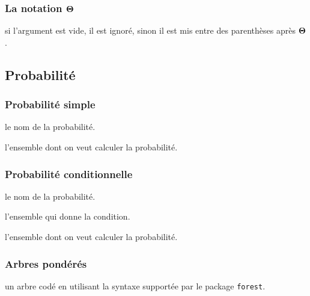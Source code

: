 \documentclass[12pt,a4paper]{article}
\theoremstyle{definition}
\begin{document}



\subsubsection{\texorpdfstring{La notation $\bigtheta{}$}%
                          {La notation "grand Theta"}}


\IDarg{} si l'argument est vide, il est ignoré, sinon il est mis entre des parenthèses après $\bigtheta{}$.
\subsection{Probabilité}

\subsubsection{Probabilité \og simple \fg}


\IDoption{} le nom de la probabilité.

\IDarg{} l'ensemble dont on veut calculer la probabilité.





\subsubsection{Probabilité conditionnelle}





\IDoption{} le nom de la probabilité.

 l'ensemble qui donne la condition.

 l'ensemble dont on veut calculer la probabilité.
\subsubsection{Arbres pondérés}



\Content{} un arbre codé en utilisant la syntaxe supportée par le package \verb+forest+.
\end{document}
